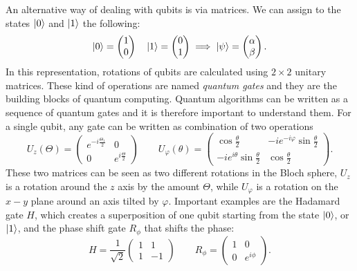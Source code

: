 An alternative way of dealing with qubits is via matrices. We can assign to the states $\ket{0}$ and $\ket{1}$ the following:
\begin{equation}
\ket{0} = \begin{pmatrix}
 1 \\
 0
\end{pmatrix} \quad
\ket{1} = \begin{pmatrix}
 0 \\
 1
\end{pmatrix} \implies \ket{\psi} = \begin{pmatrix}
 \alpha \\
 \beta
\end{pmatrix}.
\end{equation}
In this representation, rotations of qubits are calculated using $2\times2$ unitary matrices. These kind of operations are named \emph{quantum gates} and they are the building blocks of quantum computing. Quantum algorithms can be written as a sequence of quantum gates and it is therefore important to understand them. For a single qubit, any gate can be written as combination of two operations \cite{hempel}
\begin{equation}
\label{quantumgates}
U_z(\Theta) =  \begin{pmatrix}
 e^{-i\frac{\Theta_1}{2}} & 0 \\
 0 & e^{i\frac{\Theta}{2}}
\end{pmatrix} \qquad U_\varphi(\theta) = \begin{pmatrix}
\cos\frac{\theta}{2} & -i e^{-i\varphi}\sin\frac{\theta}{2} \\
-ie^{i\theta}\sin\frac{\theta}{2} & \cos\frac{\theta}{2}
\end{pmatrix}.
\end{equation}
These two matrices can be seen as two different rotations in the Bloch sphere, $U_z$ is a rotation around the $z$ axis by the amount $\Theta$, while $U_\varphi$ is a rotation on the $x-y$ plane around an axis tilted by $\varphi$. Important examples are the Hadamard gate $H$, which creates a superposition of one qubit starting from the state $\ket{0}$, or $\ket{1}$, and the phase shift gate $R_\phi$ that shifts the phase:
\begin{equation}
\label{Hadamard}
 H = \frac{1}{\sqrt{2}}\begin{pmatrix}
 1  & 1\\
1 & -1
 \end{pmatrix} \qquad R_\phi = \begin{pmatrix}
 1  & 0\\
0 & e^{i\phi}
 \end{pmatrix}.
\end{equation}
